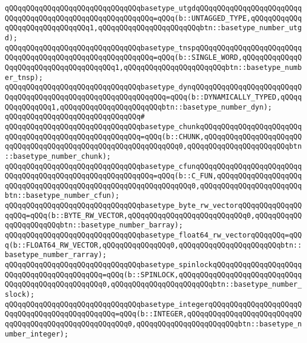 \verb|qQQqqQQqqQQqqQQqqQQqqQQqqQQqqQQqbasetype_utgdqQQqqQQqqQQqqQQqqQQqqQQqqQQqqQQqqQQqqQQqqQQqqQQqqQQqqQQqqQQq=qQQq(b::UNTAGGED_TYPE,qQQqqQQqqQQqqQQqqQQqqQQqqQQqqQQq1,qQQqqQQqqQQqqQQqqQQqqQQqbtn::basetype_number_utgd);|\newline
\verb|qQQqqQQqqQQqqQQqqQQqqQQqqQQqqQQqbasetype_tnspqQQqqQQqqQQqqQQqqQQqqQQqqQQqqQQqqQQqqQQqqQQqqQQqqQQqqQQqqQQq=qQQq(b::SINGLE_WORD,qQQqqQQqqQQqqQQqqQQqqQQqqQQqqQQqqQQqqQQq1,qQQqqQQqqQQqqQQqqQQqqQQqbtn::basetype_number_tnsp);|\newline
\verb|qQQqqQQqqQQqqQQqqQQqqQQqqQQqqQQqbasetype_dynqQQqqQQqqQQqqQQqqQQqqQQqqQQqqQQqqQQqqQQqqQQqqQQqqQQqqQQqqQQqqQQq=qQQq(b::DYNAMICALLY_TYPED,qQQqqQQqqQQqqQQq1,qQQqqQQqqQQqqQQqqQQqqQQqbtn::basetype_number_dyn);|\newline
\verb|qQQqqQQqqQQqqQQqqQQqqQQqqQQqqQQq#|\newline
\verb|qQQqqQQqqQQqqQQqqQQqqQQqqQQqqQQqbasetype_chunkqQQqqQQqqQQqqQQqqQQqqQQqqQQqqQQqqQQqqQQqqQQqqQQqqQQqqQQq=qQQq(b::CHUNK,qQQqqQQqqQQqqQQqqQQqqQQqqQQqqQQqqQQqqQQqqQQqqQQqqQQqqQQqqQQqqQQq0,qQQqqQQqqQQqqQQqqQQqqQQqbtn::basetype_number_chunk);|\newline
\verb|qQQqqQQqqQQqqQQqqQQqqQQqqQQqqQQqbasetype_cfunqQQqqQQqqQQqqQQqqQQqqQQqqQQqqQQqqQQqqQQqqQQqqQQqqQQqqQQqqQQq=qQQq(b::C_FUN,qQQqqQQqqQQqqQQqqQQqqQQqqQQqqQQqqQQqqQQqqQQqqQQqqQQqqQQqqQQqqQQq0,qQQqqQQqqQQqqQQqqQQqqQQqbtn::basetype_number_cfun);|\newline
\verb|qQQqqQQqqQQqqQQqqQQqqQQqqQQqqQQqbasetype_byte_rw_vectorqQQqqQQqqQQqqQQqqQQq=qQQq(b::BYTE_RW_VECTOR,qQQqqQQqqQQqqQQqqQQqqQQqqQQq0,qQQqqQQqqQQqqQQqqQQqqQQqbtn::basetype_number_barray);|\newline
\verb|qQQqqQQqqQQqqQQqqQQqqQQqqQQqqQQqbasetype_float64_rw_vectorqQQqqQQq=qQQq(b::FLOAT64_RW_VECTOR,qQQqqQQqqQQqqQQq0,qQQqqQQqqQQqqQQqqQQqqQQqbtn::basetype_number_rarray);|\newline
\verb|qQQqqQQqqQQqqQQqqQQqqQQqqQQqqQQqbasetype_spinlockqQQqqQQqqQQqqQQqqQQqqQQqqQQqqQQqqQQqqQQqqQQq=qQQq(b::SPINLOCK,qQQqqQQqqQQqqQQqqQQqqQQqqQQqqQQqqQQqqQQqqQQqqQQqqQQq0,qQQqqQQqqQQqqQQqqQQqqQQqbtn::basetype_number_slock);|\newline
\verb|qQQqqQQqqQQqqQQqqQQqqQQqqQQqqQQqbasetype_integerqQQqqQQqqQQqqQQqqQQqqQQqqQQqqQQqqQQqqQQqqQQqqQQq=qQQq(b::INTEGER,qQQqqQQqqQQqqQQqqQQqqQQqqQQqqQQqqQQqqQQqqQQqqQQqqQQqqQQq0,qQQqqQQqqQQqqQQqqQQqqQQqbtn::basetype_number_integer);|\newline
\newline
\newline
\newline
